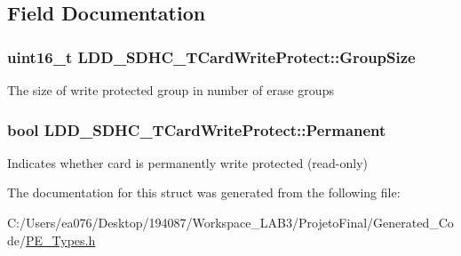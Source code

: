 \subsection{Field Documentation}
\hypertarget{struct_l_d_d___s_d_h_c___t_card_write_protect_ae05b5dd538cf47f5ec24559246415306}{
\subsubsection[{Group\-Size}]{\setlength{\rightskip}{0pt plus 5cm}uint16\-\_\-t L\-D\-D\-\_\-\-S\-D\-H\-C\-\_\-\-T\-Card\-Write\-Protect\-::\-Group\-Size}}\label{struct_l_d_d___s_d_h_c___t_card_write_protect_ae05b5dd538cf47f5ec24559246415306}
The size of write protected group in number of erase groups \hypertarget{struct_l_d_d___s_d_h_c___t_card_write_protect_aff6b0178087c770234bd68974d643552}{
\subsubsection[{Permanent}]{\setlength{\rightskip}{0pt plus 5cm}bool L\-D\-D\-\_\-\-S\-D\-H\-C\-\_\-\-T\-Card\-Write\-Protect\-::\-Permanent}}\label{struct_l_d_d___s_d_h_c___t_card_write_protect_aff6b0178087c770234bd68974d643552}
Indicates whether card is permanently write protected (read-\/only) 

The documentation for this struct was generated from the following file\-:\begin{DoxyCompactItemize}
\item 
C\-:/\-Users/ea076/\-Desktop/194087/\-Workspace\-\_\-\-L\-A\-B3/\-Projeto\-Final/\-Generated\-\_\-\-Code/\hyperlink{_p_e___types_8h}{P\-E\-\_\-\-Types.\-h}\end{DoxyCompactItemize}
